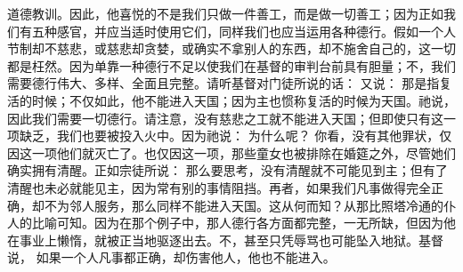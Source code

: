 道德教训。因此，他喜悦的不是我们只做一件善工，而是做一切善工；因为正如我们有五种感官，并应当适时使用它们，同样我们也应当运用各种德行。假如一个人节制却不慈悲，或慈悲却贪婪，或确实不拿别人的东西，却不施舍自己的，这一切都是枉然。因为单靠一种德行不足以使我们在基督的审判台前具有胆量；不，我们需要德行伟大、多样、全面且完整。请听基督对门徒所说的话： 又说： 那是指复活的时候；不仅如此，他不能进入天国；因为主也惯称复活的时候为天国。祂说， 因此我们需要一切德行。请注意，没有慈悲之工就不能进入天国；但即使只有这一项缺乏，我们也要被投入火中。因为祂说： 为什么呢？ 你看，没有其他罪状，仅因这一项他们就灭亡了。也仅因这一项，那些童女也被排除在婚筵之外，尽管她们确实拥有清醒。正如宗徒所说： 那么要思考，没有清醒就不可能见到主；但有了清醒也未必就能见主，因为常有别的事情阻挡。再者，如果我们凡事做得完全正确，却不为邻人服务，那么同样不能进入天国。这从何而知？从那比照塔冷通的仆人的比喻可知。因为在那个例子中，那人德行各方面都完整，一无所缺，但因为他在事业上懒惰，就被正当地驱逐出去。不，甚至只凭辱骂也可能坠入地狱。基督说， 如果一个人凡事都正确，却伤害他人，他也不能进入。\par

